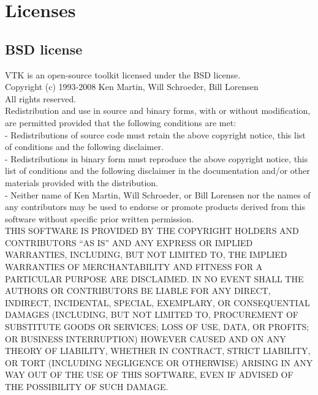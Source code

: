 \documentclass[a4paper,12pt,openany]{book}
\theoremstyle{break}
\begin{document}

\renewcommand{\bibname}{References}


\newpage
\section{Licenses}
\subsection{BSD license}
VTK is an open-source toolkit licensed under the BSD license.\\
Copyright (c) 1993-2008 Ken Martin, Will Schroeder, Bill Lorensen \\
All rights reserved.\\
Redistribution and use in source and binary forms, with or without modification, are permitted provided that the following conditions are met: \\
- Redistributions of source code must retain the above copyright notice, this list of conditions and the following disclaimer. \\
- Redistributions in binary form must reproduce the above copyright notice, this list of conditions and the following disclaimer in the documentation and/or other materials provided with the distribution. \\
- Neither name of Ken Martin, Will Schroeder, or Bill Lorensen nor the names of any contributors may be used to endorse or promote products derived from this software without specific prior written permission.\\

THIS SOFTWARE IS PROVIDED BY THE COPYRIGHT HOLDERS AND CONTRIBUTORS “AS IS” AND ANY EXPRESS OR IMPLIED WARRANTIES, INCLUDING, BUT NOT LIMITED TO, THE IMPLIED WARRANTIES OF MERCHANTABILITY AND FITNESS FOR A PARTICULAR PURPOSE ARE DISCLAIMED. IN NO EVENT SHALL THE AUTHORS OR CONTRIBUTORS BE LIABLE FOR ANY DIRECT, INDIRECT, INCIDENTAL, SPECIAL, EXEMPLARY, OR CONSEQUENTIAL DAMAGES (INCLUDING, BUT NOT LIMITED TO, PROCUREMENT OF SUBSTITUTE GOODS OR SERVICES; LOSS OF USE, DATA, OR PROFITS; OR BUSINESS INTERRUPTION) HOWEVER CAUSED AND ON ANY THEORY OF LIABILITY, WHETHER IN CONTRACT, STRICT LIABILITY, OR TORT (INCLUDING NEGLIGENCE OR OTHERWISE) ARISING IN ANY WAY OUT OF THE USE OF THIS SOFTWARE, EVEN IF ADVISED OF THE POSSIBILITY OF SUCH DAMAGE.
\end{document}
